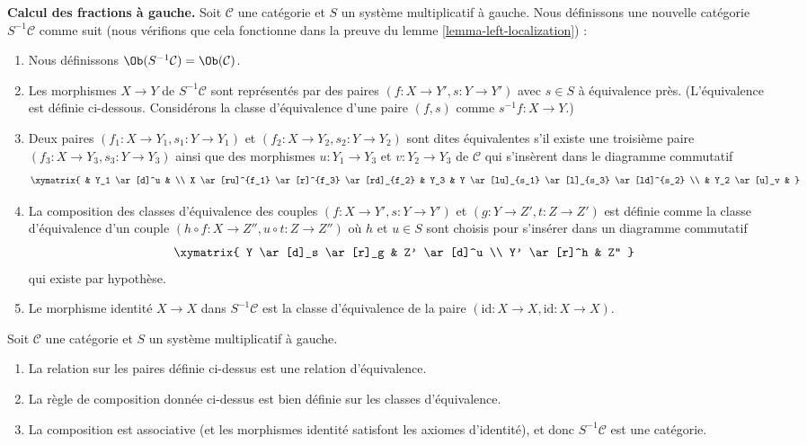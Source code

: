\medskip\noindent
{\bf Calcul des fractions à gauche.} Soit $\mathcal{C}$ une catégorie et $S$
un système multiplicatif à gauche. Nous définissons une nouvelle catégorie
$S^{-1}\mathcal{C}$ comme suit (nous vérifions que cela fonctionne dans la
preuve du lemme \ref{lemma-left-localization}) :
\begin{enumerate}
\item Nous définissons $\Ob(S^{-1}\mathcal{C}) = \Ob(\mathcal{C})$.
\item Les morphismes $X \to Y$ de $S^{-1}\mathcal{C}$ sont représentés par des paires
$(f : X \to Y', s : Y \to Y')$ avec $s \in S$ à équivalence près.
(L'équivalence est définie ci-dessous. Considérons la classe d'équivalence d'une
paire $(f, s)$ comme $s^{-1}f : X \to Y$.)
\item Deux paires $(f_1 : X \to Y_1, s_1 : Y \to Y_1)$ et $(f_2 : X \to Y_2, s_2 : Y \to Y_2)$ sont dites équivalentes s'il existe une troisième paire
$(f_3 : X \to Y_3, s_3 : Y \to Y_3)$ ainsi que des morphismes $u : Y_1 \to Y_3$ et $v : Y_2 \to Y_3$ de $\mathcal{C}$ qui s'insèrent dans le diagramme commutatif
$$
\xymatrix{
 & Y_1 \ar[d]^u & \\
X \ar[ru]^{f_1} \ar[r]^{f_3} \ar[rd]_{f_2} &
Y_3 &
Y \ar[lu]_{s_1} \ar[l]_{s_3} \ar[ld]^{s_2} \\
& Y_2 \ar[u]_v &
}
$$
\item La composition des classes d'équivalence des couples $(f : X \to Y', s : Y \to Y')$ et $(g : Y \to Z', t : Z \to Z')$ est définie comme la classe
d'équivalence d'un couple $(h \circ f : X \to Z'', u \circ t : Z \to Z'')$ où
$h$ et $u \in S$ sont choisis pour s'insérer dans un diagramme commutatif
$$
\xymatrix{
Y \ar[d]_s \ar[r]_g & Z' \ar[d]^u \\
Y' \ar[r]^h & Z''
}
$$
qui existe par hypothèse.
\item Le morphisme identité $X \to X$ dans $S^{-1} \mathcal{C}$ est la
classe d'équivalence de la paire $(\text{id} : X \to X,
\text{id} : X \to X)$.
\end{enumerate}

\begin{lemma}
\label{lemma-left-localization}
Soit $\mathcal{C}$ une catégorie et $S$ un système multiplicatif à gauche.
\begin{enumerate}
\item La relation sur les paires définie ci-dessus est une relation d'équivalence.
\item La règle de composition donnée ci-dessus est bien définie sur les
classes d'équivalence.
\item La composition est associative (et les morphismes identité satisfont
les axiomes d'identité), et donc $S^{-1}\mathcal{C}$ est une catégorie.
\end{enumerate}
\end{lemma}

